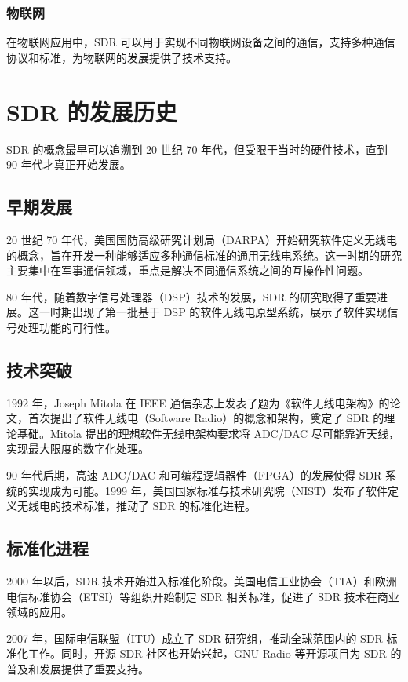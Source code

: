 \documentclass[UTF8]{ctexbook}
\begin{document}
\subsubsection{物联网}
在物联网应用中，SDR 可以用于实现不同物联网设备之间的通信，支持多种通信协议和标准，为物联网的发展提供了技术支持。
\section{SDR 的发展历史}

SDR 的概念最早可以追溯到 20 世纪 70 年代，但受限于当时的硬件技术，直到 90 年代才真正开始发展。

\subsection{早期发展}

20 世纪 70 年代，美国国防高级研究计划局（DARPA）开始研究软件定义无线电的概念，旨在开发一种能够适应多种通信标准的通用无线电系统。这一时期的研究主要集中在军事通信领域，重点是解决不同通信系统之间的互操作性问题。

80 年代，随着数字信号处理器（DSP）技术的发展，SDR 的研究取得了重要进展。这一时期出现了第一批基于 DSP 的软件无线电原型系统，展示了软件实现信号处理功能的可行性。

\subsection{技术突破}

1992 年，Joseph Mitola 在 IEEE 通信杂志上发表了题为《软件无线电架构》的论文，首次提出了软件无线电（Software Radio）的概念和架构，奠定了 SDR 的理论基础。Mitola 提出的理想软件无线电架构要求将 ADC/DAC 尽可能靠近天线，实现最大限度的数字化处理。

90 年代后期，高速 ADC/DAC 和可编程逻辑器件（FPGA）的发展使得 SDR 系统的实现成为可能。1999 年，美国国家标准与技术研究院（NIST）发布了软件定义无线电的技术标准，推动了 SDR 的标准化进程。

\subsection{标准化进程}

2000 年以后，SDR 技术开始进入标准化阶段。美国电信工业协会（TIA）和欧洲电信标准协会（ETSI）等组织开始制定 SDR 相关标准，促进了 SDR 技术在商业领域的应用。

2007 年，国际电信联盟（ITU）成立了 SDR 研究组，推动全球范围内的 SDR 标准化工作。同时，开源 SDR 社区也开始兴起，GNU Radio 等开源项目为 SDR 的普及和发展提供了重要支持。
\end{document}
